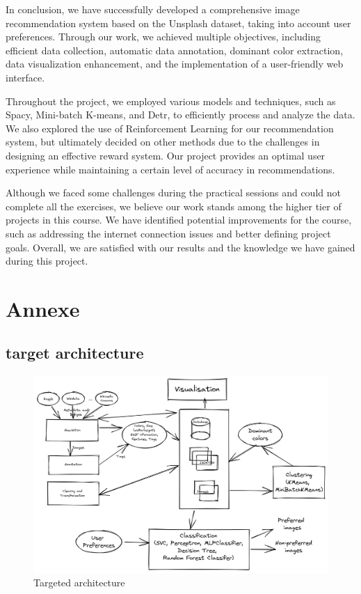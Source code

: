\documentclass{article}
\begin{document}
    In conclusion, we have successfully developed a comprehensive image recommendation system based on the Unsplash dataset, taking into account user preferences.
    Through our work, we achieved multiple objectives, including efficient data collection, automatic data annotation, dominant color extraction, data visualization enhancement, and the implementation of a user-friendly web interface.

    Throughout the project, we employed various models and techniques, such as Spacy, Mini-batch K-means, and Detr, to efficiently process and analyze the data.
    We also explored the use of Reinforcement Learning for our recommendation system, but ultimately decided on other methods due to the challenges in designing an effective reward system.
    Our project provides an optimal user experience while maintaining a certain level of accuracy in recommendations.

    Although we faced some challenges during the practical sessions and could not complete all the exercises, we believe our work stands among the higher tier of projects in this course.
    We have identified potential improvements for the course, such as addressing the internet connection issues and better defining project goals.
    Overall, we are satisfied with our results and the knowledge we have gained during this project.

    \newpage
    \appendix


    \section{Annexe}\label{sec:annexe}

    \subsection{target architecture}\label{subsec:target_architecture}

    \begin{figure}[htbp]
        \centering
        \includegraphics[width=0.8 \textwidth]{img/targeted_archi}
        \caption{Targeted architecture}
        \label{fig:targeted_architecture}
    \end{figure}
\end{document}
